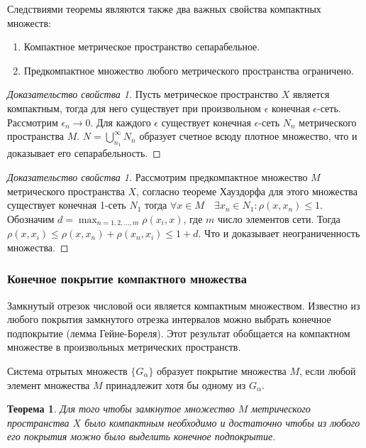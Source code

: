 \documentclass[14pt,a4paper]{extarticle}
\newtheorem{theorem}{Теорема}[section]
\theoremstyle{definition}
\theoremstyle{remark}
\renewcommand{\[}{\begin{dmath*}[compact]}
\renewcommand{\]}{\end{dmath*}}
\newcommand{\be}{\begin{enumerate}}
\newcommand{\ee}{\end{enumerate}}
\begin{document}
Следствиями теоремы являются также два важных свойства компактных множеств:

\be
  \item Компактное метрическое пространство сепарабельное.
  \item Предкомпактное множество любого метрического пространства ограничено.
\ee

\begin{proof}[Доказательство свойства 1]
  Пусть метрическое пространство $X$ является компактным,
  тогда для него существует при произвольном $\epsilon$
  конечная $\epsilon$-сеть.
  Рассмотрим $\epsilon_n \to 0$. Для каждого $\epsilon$ существует конечная
  $\epsilon$-сеть $N_n$ метрического пространства $M$.
  $N=\bigcup _{n_1}^{\infty} N_n$ образует счетное всюду плотное множество,
  что и доказывает его сепарабельность.
\end{proof}

\begin{proof}[Доказательство свойства 1]
  Рассмотрим предкомпактное множество $M$
  метрического пространства $X$, согласно теореме Хауздорфа для этого множества
  существует конечная 1-сеть $N_1$ тогда
  $\forall x \in M\quad \exists x_n \in N_1: \rho(x, x_n) \leq 1$.
  Обозначим $d=\max_{n=1,2,\dots,m}\rho(x_i,x)$, где $m$ число элементов сети.
  Тогда $\rho(x, x_i) \leq \rho(x, x_n)+\rho(x_n, x_i) \leq 1+d$.
  Что и доказывает неограниченность множества.
\end{proof}

\subsubsection{Конечное покрытие компактного множества}

Замкнутый отрезок числовой оси является компактным множеством.
Известно из любого покрытия замкнутого отрезка интервалов можно выбрать
конечное подпокрытие (лемма Гейне-Бореля).
Этот результат обобщается на компактном множестве в произвольных
метрических пространств.

Система отрытых множеств $\{G_\alpha\}$ образует покрытие множества $M$,
если любой элемент множества $M$ принадлежит хотя бы одному из $G_\alpha$.

\begin{theorem}
  Для того чтобы замкнутое множество $M$ метрического пространства $X$ было
  компактным необходимо и достаточно чтобы из любого его покрытия можно было
  выделить конечное подпокрытие.
\end{theorem}
\end{document}
